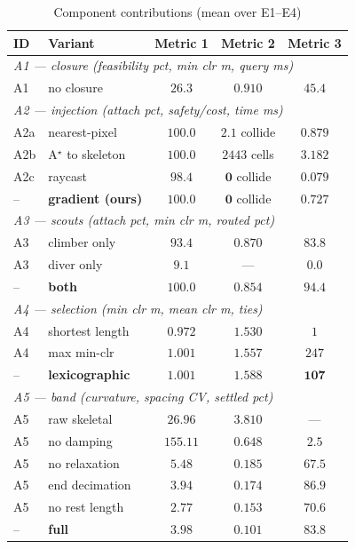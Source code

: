 \documentclass[conference]{IEEEtran}
\begin{document}



\begin{table}[htbp]
\caption{Component contributions (mean over E1--E4)}
\label{tab:ablation}
\begin{center}
\setlength{\tabcolsep}{4pt}
\begin{tabular}{llccc}
\toprule
\textbf{ID} & \textbf{Variant} & \textbf{Metric 1} & \textbf{Metric 2} & \textbf{Metric 3} \\
\midrule
\multicolumn{5}{l}{\textit{A1 --- closure (feasibility pct, min clr m, query ms)}} \\
A1 & no closure & $26.3$ & $0.910$ & $45.4$ \\
\midrule
\multicolumn{5}{l}{\textit{A2 --- injection (attach pct, safety/cost, time ms)}} \\
A2a & nearest-pixel & $100.0$ & $2.1$ collide & $0.879$ \\
A2b & A$^\star$ to skeleton & $100.0$ & $2443$ cells & $3.182$ \\
A2c & raycast~\cite{qi2025egvg} & $98.4$ & $\mathbf{0}$ collide & $\mathbf{0.079}$ \\
-- & \textbf{gradient (ours)} & $\mathbf{100.0}$ & $\mathbf{0}$ collide & $0.727$ \\
\midrule
\multicolumn{5}{l}{\textit{A3 --- scouts (attach pct, min clr m, routed pct)}} \\
A3 & climber only & $93.4$ & $0.870$ & $83.8$ \\
A3 & diver only & $9.1$ & --- & $0.0$ \\
-- & \textbf{both} & $\mathbf{100.0}$ & $0.854$ & $\mathbf{94.4}$ \\
\midrule
\multicolumn{5}{l}{\textit{A4 --- selection (min clr m, mean clr m, ties)}} \\
A4 & shortest length & $0.972$ & $1.530$ & $1$ \\
A4 & max min-clr & $\mathbf{1.001}$ & $1.557$ & $247$ \\
-- & \textbf{lexicographic} & $\mathbf{1.001}$ & $\mathbf{1.588}$ & $\mathbf{107}$ \\
\midrule
\multicolumn{5}{l}{\textit{A5 --- band (curvature, spacing CV, settled pct)}} \\
A5 & raw skeletal & $26.96$ & $3.810$ & --- \\
A5 & no damping & $155.11$ & $0.648$ & $2.5$ \\
A5 & no relaxation & $5.48$ & $0.185$ & $67.5$ \\
A5 & end decimation & $3.94$ & $0.174$ & $\mathbf{86.9}$ \\
A5 & no rest length & $\mathbf{2.77}$ & $0.153$ & $70.6$ \\
-- & \textbf{full} & $3.98$ & $\mathbf{0.101}$ & $83.8$ \\
\bottomrule
\end{tabular}
\end{center}


\end{table}
\end{document}
